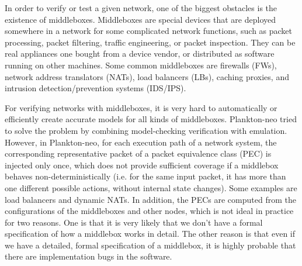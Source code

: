 In order to verify or test a given network, one of the biggest obstacles is the
existence of middleboxes. Middleboxes are special devices that are deployed
somewhere in a network for some complicated network functions, such as packet
processing, packet filtering, traffic engineering, or packet inspection. They
can be real appliances one bought from a device vendor, or distributed as
software running on other machines. Some common middleboxes are firewalls (FWs),
network address translators (NATs), load balancers (LBs), caching proxies, and
intrusion detection/prevention systems (IDS/IPS).

For verifying networks with middleboxes, it is very hard to automatically or
efficiently create accurate models for all kinds of middleboxes. Plankton-neo
\cite{2018-PrabhuEtAl} tried to solve the problem by combining model-checking
verification with emulation. However, in Plankton-neo, for each execution path
of a network system, the corresponding representative packet of a packet
equivalence class (PEC) is injected only once, which does not provide sufficient
coverage if a middlebox behaves non-deterministically (i.e. for the same input
packet, it has more than one different possible actions, without internal state
changes). Some examples are load balancers and dynamic NATs. In addition, the
PECs are computed from the configurations of the middleboxes and other nodes,
which is not ideal in practice for two reasons. One is that it is very likely
that we don't have a formal specification of how a middlebox works in detail.
The other reason is that even if we have a detailed, formal specification of a
middlebox, it is highly probable that there are implementation bugs in the
software.




